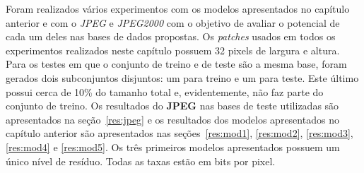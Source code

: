 Foram realizados vários experimentos com os modelos apresentados no capítulo anterior e com o \textit{JPEG} e \textit{JPEG2000} com o objetivo de avaliar o potencial de cada um deles nas bases de dados propostas. Os \textit{patches} usados em todos os experimentos realizados neste capítulo possuem 32 pixels de largura e altura. Para os testes em que o conjunto de treino e de teste são a mesma base, foram gerados dois subconjuntos disjuntos: um para treino e um para teste. Este último possui cerca de 10\% do tamanho total e, evidentemente, não faz parte do conjunto de treino. Os resultados do \textbf{JPEG} nas bases de teste utilizadas são apresentados na seção~\ref{res:jpeg} e os resultados dos modelos apresentados no capítulo anterior são apresentados nas seções~\ref{res:mod1}, \ref{res:mod2}, \ref{res:mod3}, \ref{res:mod4} e \ref{res:mod5}. Os três primeiros modelos apresentados possuem um único nível de resíduo. Todas as taxas estão em bits por pixel.
